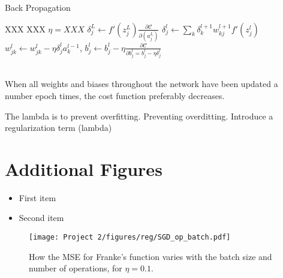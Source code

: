 \documentclass[english,notitlepage,reprint,nofootinbib]{revtex4-2}  %
\begin{document}
\begin{algorithm}[H]
    \caption{Back Propagation}\label{algo:FFNN_BP}
    \begin{algorithmic}
        \State XXX 
        \State XXX
        \State $\eta = XXX$ 
        \State $\delta_j^L \leftarrow f'(z_j^L) \frac{\partial\mathcal{C}}{\partial(a_j^L)}$
        \State $\delta_j^l \leftarrow \sum_k \delta_k^{l+1} w_{kj}^{l+1} f'(z_j^l)$
        \State $w^l_{jk} \leftarrow w^l_{jk} - \eta\delta^l_j a^{l-1}_k$, 
        \State $b^l_{j} \leftarrow b^l_{j} - \eta\frac{\partial\mathcal{C}}{\partial b^l_j = b^l_j - \eta\delta^l_j}$
        
    \end{algorithmic}
\end{algorithm}
\vspace{3mm}
\\
When all weights and biases throughout the network have been updated a number epoch times, the cost function preferably decreases. 

The lambda is to prevent overfitting. 
Preventing overditting. Introduce a regularization term (lambda) 






\section{Additional Figures}

\begin{itemize}
\color{white}
\item First item
\item Second item
\end{itemize}

\begin{figure}[h!]
    \centering %
    \texttt{[image: Project 2/figures/reg/SGD\_op\_batch.pdf]} 
    \caption{How the MSE for Franke's function varies with the batch size and number of operations, for $\eta=0.1$. }
    \label{fig: a3}
\end{figure}
\end{document}
